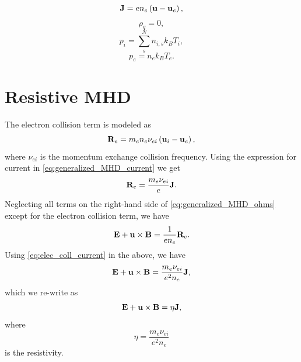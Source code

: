 \documentclass[a4paper,11pt]{report}
\begin{document}
\begin{equation}
    \label{eq:generalized_MHD_current}
    \mathbf{J} = e n_e \left(\mathbf{u} - \mathbf{u}_e \right),
\end{equation}
\begin{equation}
    \label{eq:generalized_MHD_charge}
    \rho_q = 0,
\end{equation}
\begin{equation}
    \label{eq:generalized_MHD_ion_eos}
    p_i = \sum_s^N n_{i,s} k_B T_i,
\end{equation}
\begin{equation}
    \label{eq:generalized_MHD_elec_eos}
    p_e = n_e k_B T_e.
\end{equation}

\section{Resistive MHD}
The electron collision term is modeled as
\begin{equation}
    \mathbf{R}_e = m_e n_e \nu_{ei} \left ( \mathbf{u}_i - \mathbf{u}_e \right ),
\end{equation}
where $\nu_{ei}$ is the momentum exchange collision frequency. Using the expression for current in \cref{eq:generalized_MHD_current} we get
\begin{equation}
\label{eq:elec_coll_current}
    \mathbf{R}_e = \frac{m_e \nu_{ei}}{e} \mathbf{J}.
\end{equation}
Neglecting all terms on the right-hand side of \cref{eq:generalized_MHD_ohms} except for the electron collision term, we have
\begin{equation}
    \mathbf{E} + \mathbf{u} \times \mathbf{B} = \frac{1}{e n_e} \mathbf{R}_e.
\end{equation}
Using \cref{eq:elec_coll_current} in the above, we have
\begin{equation}
    \mathbf{E} + \mathbf{u} \times \mathbf{B} = \frac{m_e \nu_{ei}}{e^2 n_e} \mathbf{J},
\end{equation}
which we re-write as 
\begin{equation}
    \mathbf{E} + \mathbf{u} \times \mathbf{B} = \eta \mathbf{J},
\end{equation}
where
\begin{equation}
\label{eq:resistivity}
    \eta = \frac{m_e \nu_{ei}}{e^2 n_e}
\end{equation}
is the resistivity.
\end{document}

